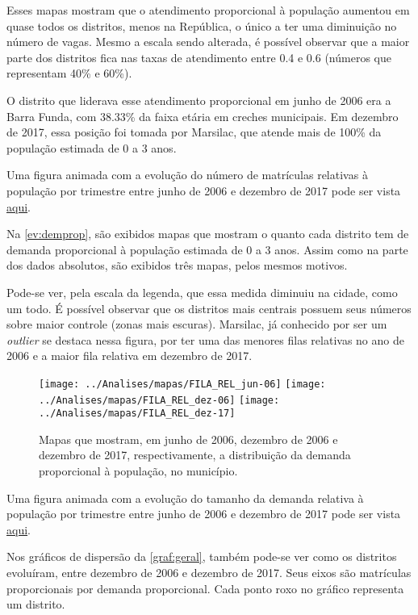 Esses mapas mostram que o atendimento proporcional à população aumentou em quase todos os distritos, menos na República, o único a ter uma diminuição no número de vagas. Mesmo a escala sendo alterada, é possível observar que a maior parte dos distritos fica nas taxas de atendimento entre 0.4 e 0.6 (números que representam 40\% e 60\%).

O distrito que liderava esse atendimento proporcional em junho de 2006 era a Barra Funda, com 38.33\% da faixa etária em creches municipais. Em dezembro de 2017, essa posição foi tomada por Marsilac, que atende mais de 100\% da população estimada de 0 a 3 anos. 

Uma figura animada com a evolução do número de matrículas relativas à população por trimestre entre junho de 2006 e dezembro de 2017 pode ser vista \href{https://lsflp.github.io/MAC0213/Multimidia/ATEND_REL.gif}{aqui}.

Na \autoref{ev:demprop}, são exibidos mapas que mostram o quanto cada distrito tem de demanda proporcional à população estimada de 0 a 3 anos. Assim como na parte dos dados absolutos, são exibidos três mapas, pelos mesmos motivos. 

Pode-se ver, pela escala da legenda, que essa medida diminuiu na cidade, como um todo. É possível observar que os distritos mais centrais possuem seus números sobre maior controle (zonas mais escuras). Marsilac, já conhecido por ser um \textit{outlier} se destaca nessa figura, por ter uma das menores filas relativas no ano de 2006 e a maior fila relativa em dezembro de 2017.

\begin{figure}[H]
	\centering
	\texttt{[image: ../Analises/mapas/FILA\_REL\_jun-06]}
	\texttt{[image: ../Analises/mapas/FILA\_REL\_dez-06]}
	\texttt{[image: ../Analises/mapas/FILA\_REL\_dez-17]}
	\caption{Mapas que mostram, em junho de 2006, dezembro de 2006 e dezembro de 2017, respectivamente, a distribuição da demanda proporcional à população, no município.}
	\label{ev:demprop}
\end{figure}

Uma figura animada com a evolução do tamanho da demanda relativa à população por trimestre entre junho de 2006 e dezembro de 2017 pode ser vista \href{https://lsflp.github.io/MAC0213/Multimidia/FILA_REL.gif}{aqui}.

Nos gráficos de dispersão da \autoref{graf:geral}, também pode-se ver como os distritos evoluíram, entre dezembro de 2006 e dezembro de 2017. Seus eixos são matrículas proporcionais por demanda proporcional. Cada ponto roxo no gráfico representa um distrito.

